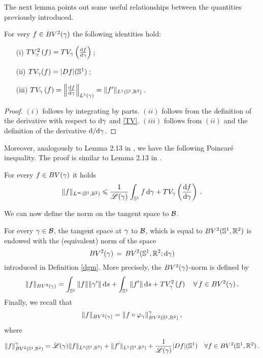 The next lemma points out some useful relationships between the quantities previously introduced.

\begin{lem}\label{equiv} For very $f \in BV^2(\gamma)$ the following identities hold:

\begin{itemize}
\item[(i)] $TV_\gamma^2\left(f\right)=TV_\gamma\left(\frac{\mathrm{d} f}{\mathrm{d} \gamma}\right)\,$;

\item[(ii)] $TV_\gamma(f)=|Df|(\mathbb{S}^1)\,$;

\item[(iii)] $TV_\gamma\left(f\right)=\left\| \frac{\mathrm{d} f}{\mathrm{d} \gamma}\right\|_{L^1(\gamma)}=\|f'\|_{L^1(\mathbb{S}^1,\mathbb{R}^2)}\,$.

\end{itemize}

\end{lem}

\begin{proof} $(i)$ follows by integrating by parts. $(ii)$ follows from the definition of the derivative with respect to $\mathrm{d} \gamma$ and \eqref{TV}. $(iii)$ follows from $(ii)$ and the definition of the derivative $\mathrm{d}/\mathrm{d}\gamma$.
\end{proof}


Moreover, analogously  to Lemma 2.13 in \cite{Bruveris}, we have the following Poincar\'e inequality. The proof is similar to Lemma 2.13 in \cite{Bruveris}. 

\begin{lem} For every $f\in BV(\gamma)$ it holds
\begin{equation}\label{embedding-gm}	
 \| f \|_{L^\infty(\mathbb{S}^1,{\mathbb R}^2)} \leqslant  \frac{1}{\mathscr{L}(\gamma)}\int_{\mathbb{S}^1} f\,\mathrm{d} \gamma  + TV_\gamma\left(  \frac{\mathrm{d} f}{\mathrm{d} \gamma} \right)\,.
\end{equation}
\end{lem}

We can now define the norm on the tangent space to $\mathcal{B}$.

\begin{defn} 

For every $\gamma\in \mathcal{B}$, the tangent space at $\gamma$ to $\mathcal{B}$, which is equal to $BV^2(\mathbb{S}^1,\mathbb{R}^2)$ is endowed with the (equivalent) norm of the space
 $$BV^2(\gamma)\,=\,BV^2(\mathbb{S}^1,{\mathbb R}^2;\mathrm{d}\gamma)$$
introduced in Definition \ref{dgm}. 
More precisely, the $BV^2(\gamma)$-norm is defined by
$$\|f\|_{BV^2(\gamma)} = \int_{\mathbb{S}^1}\|f\|\|\gamma'\|\,\mathrm{d} s + \int_{\mathbb{S}^1}\|f'\|\,\mathrm{d} s +  TV_\gamma^2\left(f\right) \quad\forall\, f\in BV^2(\gamma)\,.$$
Finally, we recall that 
\begin{equation}\label{change-arc}
\|f\|_{BV^2(\gamma)}= \|f\circ\varphi_\gamma\|_{BV^2(\mathbb{S}^1, {\mathbb R}^2)}^{\gamma}\,,
\end{equation}
where
$$
 \displaystyle{\|f\|_{BV^2(\mathbb{S}^1, {\mathbb R}^2)}^{\gamma} = \mathscr{L}(\gamma)\|f\|_{L^1(\mathbb{S}^1, {\mathbb R}^2)}+ \|f'\|_{L^1(\mathbb{S}^1, {\mathbb R}^2)}+\frac{1}{\mathscr{L}(\gamma)}|D f|(\mathbb{S}^1) \quad \forall f\in BV^2(\mathbb{S}^1, {\mathbb R}^2)} \,.
 $$



\end{defn}





